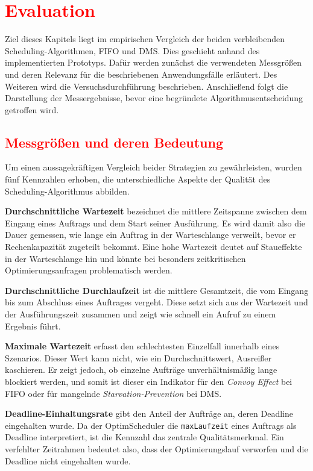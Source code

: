\documentclass[
    12pt,               
    a4paper,            
    ngerman,            
    parskip=half,       
    headings=normal,   
    numbers=enddot,     
    toc=chapterentrywithdots 
]{scrreprt}\usepackage[utf8]{inputenc}
\begin{document}
\chapter{\textcolor{red}{Evaluation}}
Ziel dieses Kapitels liegt im empirischen Vergleich der beiden verbleibenden Scheduling-Algorithmen, FIFO und DMS. Dies geschieht anhand des implementierten Prototyps. Dafür werden zunächst die verwendeten Messgrößen und deren Relevanz für die beschriebenen Anwendungsfälle erläutert. Des Weiteren wird die Versuchsdurchführung beschrieben. Anschließend folgt die Darstellung der Messergebnisse, bevor eine begründete Algorithmusentscheidung getroffen wird.

\section{\textcolor{red}{Messgrößen und deren Bedeutung}}
Um einen aussagekräftigen Vergleich beider Strategien zu gewährleisten, wurden fünf Kennzahlen erhoben, die unterschiedliche Aspekte der Qualität des Scheduling-Algorithmus abbilden.

\textbf{Durchschnittliche Wartezeit} bezeichnet die mittlere Zeitspanne zwischen dem Eingang eines Auftrags und dem Start seiner Ausführung. Es wird damit also die Dauer gemessen, wie lange ein Auftrag in der Warteschlange verweilt, bevor er Rechenkapazität zugeteilt bekommt. Eine hohe Wartezeit deutet auf Staueffekte in der Warteschlange hin und könnte bei besonders zeitkritischen Optimierungsanfragen problematisch werden.

\textbf{Durchschnittliche Durchlaufzeit} ist die mittlere Gesamtzeit, die vom Eingang bis zum Abschluss eines Auftrages vergeht. Diese setzt sich aus der Wartezeit und der Ausführungszeit zusammen und zeigt wie schnell ein Aufruf zu einem Ergebnis führt.

\textbf{Maximale Wartezeit} erfasst den schlechtesten Einzelfall innerhalb eines Szenarios. Dieser Wert kann nicht, wie ein Durchschnittswert, Ausreißer kaschieren. Er zeigt jedoch, ob einzelne Aufträge unverhältnismäßig lange blockiert werden, und somit ist dieser ein Indikator für den \textit{Convoy Effect} bei FIFO oder für mangelnde \textit{Starvation-Prevention} bei DMS.

\newpage
\textbf{Deadline-Einhaltungsrate} gibt den Anteil der Aufträge an, deren Deadline eingehalten wurde. Da der OptimScheduler die \texttt{maxLaufzeit} eines Auftrags als Deadline interpretiert, ist die Kennzahl das zentrale Qualitätsmerkmal. Ein verfehlter Zeitrahmen bedeutet also, dass der Optimierungslauf verworfen und die Deadline nicht eingehalten wurde.
\end{document}
